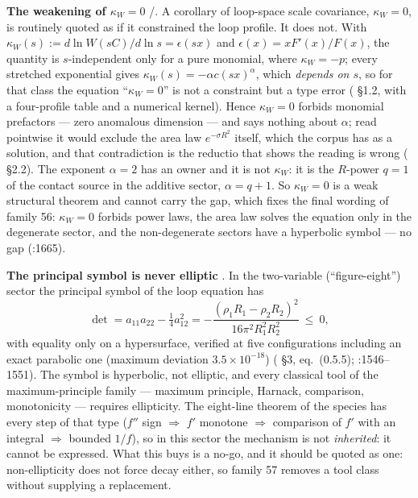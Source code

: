 \textbf{The weakening of $\kappa_W=0$} \LT{}/\LM. A corollary of loop-space scale covariance,
$\kappa_W=0$, is routinely quoted as if it constrained the loop profile. It does not.
With $\kappa_W(s):=d\ln W(sC)/d\ln s=\epsilon(sx)$ and $\epsilon(x)=xF'(x)/F(x)$, the quantity is
$s$-independent only for a pure monomial, where $\kappa_W=-p$; every stretched exponential gives
$\kappa_W(s)=-\alpha c(sx)^\alpha$, which \emph{depends on $s$}, so for that class the equation
``$\kappa_W=0$'' is not a constraint but a type error
( \S1.2, with a four-profile table and a numerical kernel). Hence $\kappa_W=0$
forbids monomial prefactors --- zero anomalous dimension --- and says nothing about $\alpha$; read
pointwise it would exclude the area law $e^{-\sigma R^2}$ itself, which the corpus has as a
solution, and that contradiction is the reductio that shows the reading is wrong
( \S2.2). The exponent $\alpha=2$ has an owner and it is not $\kappa_W$: it is
the $R$-power $q=1$ of the contact source in the additive sector, $\alpha=q+1$. So $\kappa_W=0$ is
a weak structural theorem and cannot carry the gap, which fixes the final wording of family 56:
$\kappa_W=0$ forbids power laws, the area law solves the equation only in the degenerate sector,
and the non-degenerate sectors have a hyperbolic symbol --- no gap
(:1665).

\textbf{The principal symbol is never elliptic} \LT. In the two-variable (``figure-eight'')
sector the principal symbol of the loop equation has
\begin{equation}
\det=a_{11}a_{22}-\tfrac14a_{12}^2
=-\frac{(\rho_1R_1-\rho_2R_2)^2}{16\pi^2R_1^2R_2^2}\ \le\ 0,
\label{eq:scalar-det}
\end{equation}
with equality only on a hypersurface, verified at five configurations including an exact parabolic
one (maximum deviation $3.5\times10^{-18}$) ( \S3, eq.~(0.5.5);
:1546--1551). The symbol is hyperbolic, not elliptic, and every classical
tool of the maximum-principle family --- maximum principle, Harnack, comparison, monotonicity ---
requires ellipticity. The eight-line theorem of the species has every step of that type
($f''$ sign $\Rightarrow$ $f'$ monotone $\Rightarrow$ comparison of $f'$ with an integral
$\Rightarrow$ bounded $1/f$), so in this sector the mechanism is not \emph{inherited}: it cannot be
expressed. What this buys is a no-go, and it should be quoted as one: non-ellipticity does not
force decay either, so family 57 removes a tool class without supplying a replacement.

